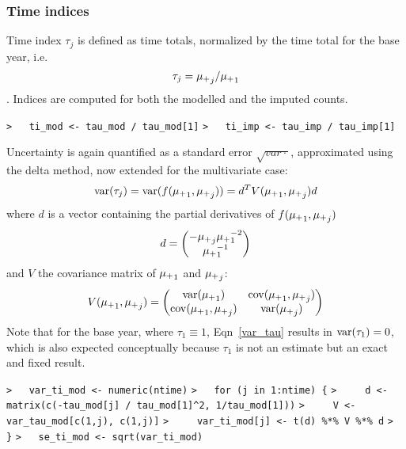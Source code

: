 \documentclass[a4paper]{article}
\begin{document}
\subsubsection{Time indices}\par

Time index $\tau_j$ is defined as time totals, normalized by the time total for the base
year, i.e.\,
$$ \tau_j = {\mu_{+}}_j / {\mu_{+}}_1 $$.
Indices are computed for both the modelled and the imputed counts.\par
\verb~>   ti_mod <- tau_mod / tau_mod[1]~\newline
\verb~>   ti_imp <- tau_imp / tau_imp[1]~\par

Uncertainty is again quantified as a standard error $\sqrt{var{\cdot}}$,
approximated using the delta method, now extended for the multivariate case:
\begin{equation}
  \operatorname{var}(\tau_j) = \operatorname{var}(f({\mu_{+}}_1,{\mu_{+}}_j)) = d^T V({\mu_{+}}_1,{\mu_{+}}_j) d \label{var_tau}
\end{equation}
where $d$ is a vector containing the partial derivatives of $f({\mu_{+}}_1,{\mu_{+}}_j)$
\begin{equation}
  d = \begin{pmatrix} -{\mu_{+}}_j {\mu_{+}}_1^{-2} \\ {\mu_{+}}_1^{-1} \end{pmatrix}
\end{equation}
and $V$ the covariance matrix of ${\mu_{+}}_1$ and ${\mu_{+}}_j$:
\begin{equation}
  V({\mu_{+}}_1,{\mu_{+}}_j) = \begin{pmatrix}
    \operatorname{var}({\mu_{+}}_1) & \operatorname{cov}({\mu_{+}}_1, {\mu_{+}}_j) \\
    \operatorname{cov}({\mu_{+}}_1, {\mu_{+}}_j) & \operatorname{var}({\mu_{+}}_j)
  \end{pmatrix}
\end{equation}
Note that for the base year, where $\tau_1\equiv1$, Eqn~\eqref{var_tau} results in
$\operatorname{var}(\tau_1)=0$, which is also expected conceptually because $\tau_1$ is not an estimate but an exact and fixed result.\par
\verb~>   var_ti_mod <- numeric(ntime)~\newline
\verb~>   for (j in 1:ntime) {~\newline
\verb~>     d <- matrix(c(-tau_mod[j] / tau_mod[1]^2, 1/tau_mod[1]))~\newline
\verb~>     V <- var_tau_mod[c(1,j), c(1,j)]~\newline
\verb~>     var_ti_mod[j] <- t(d) %*% V %*% d~\newline
\verb~>   }~\newline
\verb~>   se_ti_mod <- sqrt(var_ti_mod)~\par
\end{document}
